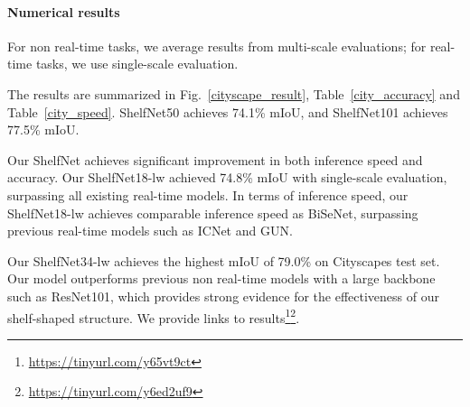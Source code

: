 \documentclass[10pt,twocolumn,letterpaper]{article}
\begin{document}
\begin{table}[h]
\caption{\small{Speed analysis (FPS) for a single forward pass. BiSeNet and ShelfNet use ResNet18 as backbone and are tested on a single GTX 1080Ti GPU. Speed for other models are from the literature.}}
\label{city_speed}
\end{table}
\vspace{-0.8cm}

\paragraph{Numerical results}
For non real-time tasks, we average results from multi-scale evaluations; for real-time tasks, we use single-scale evaluation.

The results are summarized in Fig.~\ref{cityscape_result}, Table~\ref{city_accuracy} and Table~\ref{city_speed}. ShelfNet50 achieves 74.1\% mIoU, and ShelfNet101 achieves 77.5\% mIoU.

Our ShelfNet achieves significant improvement in both inference speed and accuracy. Our ShelfNet18-lw achieved 74.8\% mIoU with single-scale evaluation, surpassing all existing real-time models. In terms of inference speed, our ShelfNet18-lw achieves comparable inference speed as BiSeNet, surpassing previous real-time models such as ICNet and GUN.

Our ShelfNet34-lw achieves the highest mIoU of 79.0\% on Cityscapes test set. Our model outperforms previous non real-time models with a large backbone such as ResNet101, which provides strong evidence for the effectiveness of our shelf-shaped structure. We provide links to results\footnote{\url{https://tinyurl.com/y65vt9ct}}\footnote{\url{https://tinyurl.com/y6ed2uf9}}.
\end{document}
